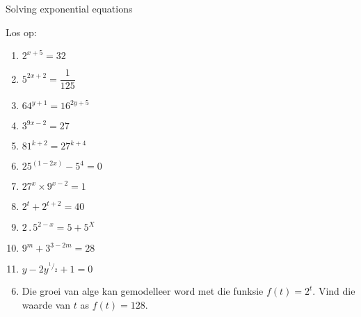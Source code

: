 \begin{exercises}{Solving exponential equations}
{
Los op:
\begin{multicols}{2}
\begin{enumerate}[noitemsep, label=\textbf{\arabic*}., itemsep=5pt]
\item $ 2^{x+5} = 32 $
\item $ 5^{2x+2} = \dfrac{1}{125} $
\item $ 64^{y+1} = 16^{2y+5} $
\item $ 3^{9x-2} = 27 $
\item $ 81^{k+2} = 27^{k+4} $
\setcounter{enumi}{6}
\item $ 25^{(1-2x)}-5^4 = 0 $
\item $ 27^x \times 9^{x-2} = 1 $
\item $ 2^t + 2^{t+2} = 40 $
\item $ 2 \,.\, 5^{2-x} = 5+ 5^X $
\item $ 9^m + 3^{3-2m} = 28 $
\item $ y - 2y^{^1/_2} + 1 = 0 $
\end{enumerate}
\end{multicols}

\begin{enumerate}[noitemsep, label=\textbf{\arabic*}., itemsep=5pt]
\setcounter{enumi}{5}
 \item Die groei van alge kan gemodelleer word met die funksie $f(t) = 2^t$. Vind die waarde van $t$ as $f(t)=128$.   
\end{enumerate}

}
\end{exercises}







